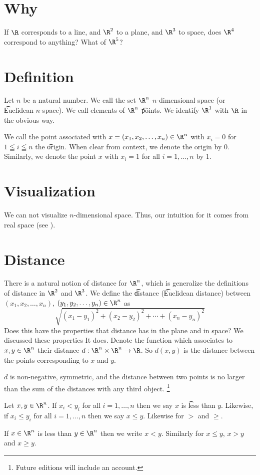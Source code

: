
\section*{Why}

If $\R $ corresponds to a line, and $\R ^2$ to a plane, and $\R ^3$ to space, does $\R ^4$ correspond to anything? What of $\R ^5$?

\section*{Definition}

Let $n$ be a natural number.
We call the set $\R ^n$ \t{$n$-dimensional space} (or \t{Euclidean $n$-space}).
We call elements of $\R ^n$ \t{points}.
We identify $\R ^1$ with $\R $ in the obvious way.

We call the point associated with $x = (x_1, x_2, \dots , x_n) \in \R ^n$ with $x_i = 0$ for $1 \leqq i \leqq n$ the \t{origin}.
When clear from context, we denote the origin by $0$.
Similarly, we denote the point $x$ with $x_i = 1$ for all $i = 1, \dots , n$ by $1$.

\section*{Visualization}

We can not visualize $n$-dimensional space.
Thus, our intuition for it comes from real space (see ).

\section*{Distance}

There is a natural notion of distance for $\R ^n$, which is generalize the definitions of distance in $\R ^2$ and $\R ^3$.
We define the \t{distance} (\t{Euclidean distance}) between $(x_1, x_2, \dots , x_n)$, $(y_1, y_2, \dots , y_n) \in \R ^n$ as
  \[
\sqrt{(x_1 - y_1)^2 + (x_2 - y_2)^2 + \cdots + (x_n - y_n)^2}
  \]
Does this have the properties that distance has in the plane and in space?
We discussed these properties
It does.
Denote the function which associates to $x, y \in \R ^n$ their distance $d: \R ^n \times \R ^n \to \R $.
So $d(x, y)$ is the distance between the points corresponding to $x$ and $y$.

\begin{proposition}
$d$ is non-negative, symmetric, and the distance between two points is no larger than the sum of the distances with any third object.
  \ifhmode\unskip\fi\footnote{
Future editions will include an account.
  }
\end{proposition}


Let $x, y \in \R ^n$.
If $x_i < y_i$ for all $i = 1, \dots , n$ then we say $x$ is \t{less than} $y$.
Likewise, if $x_i \leq y_i$ for all $i = 1, \dots , n$ then we say $x \leq y$.
Likewise for $>$ and $\geq$.

If $x \in \R ^n$ is less than $y \in \R ^n$ then we write $x < y$.
Similarly for $x \leq y$, $x > y$ and $x \geq y$.
